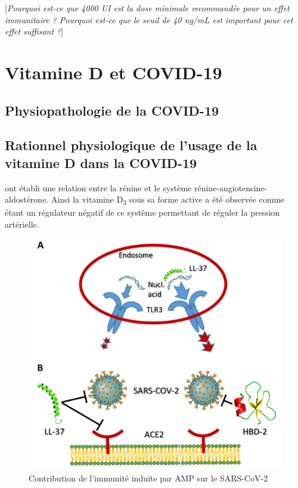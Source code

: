 \documentclass[
  a4paper,
  DIV=11,
  numbers=noendperiod,
  listof=totoc]{scrreprt}
\begin{document}
{[}\emph{Pourquoi est-ce que 4000 UI est la dose minimale recommandée
pour un effet immunitaire ? Pourquoi est-ce que le seuil de 40 ng/mL est
important pour cet effet suffisant ?}{]}

\newpage{}

\hypertarget{vitamine-d-et-covid-19}{%
\chapter{Vitamine D et COVID-19}\label{vitamine-d-et-covid-19}}

\hypertarget{physiopathologie-de-la-covid-19}{%
\section{Physiopathologie de la
COVID-19}\label{physiopathologie-de-la-covid-19}}

\hypertarget{rationnel-physiologique-de-lusage-de-la-vitamine-d-dans-la-covid-19}{%
\section{Rationnel physiologique de l'usage de la vitamine D dans la
COVID-19}\label{rationnel-physiologique-de-lusage-de-la-vitamine-d-dans-la-covid-19}}

\textcite{Li.2002} ont établi une relation entre la rénine et le système
rénine-angiotensine-aldostérone. Ainsi la vitamine D\textsubscript{3}
sous sa forme active a été observée comme étant un régulateur négatif de
ce système permettant de réguler la pression artérielle.

\begin{figure}

{\centering \includegraphics{figures/vd-amp.png}

}

\caption{Contribution de l'immunité induite par AMP sur le SARS-CoV-2
\autocite{White.2022}}

\end{figure}
\end{document}
